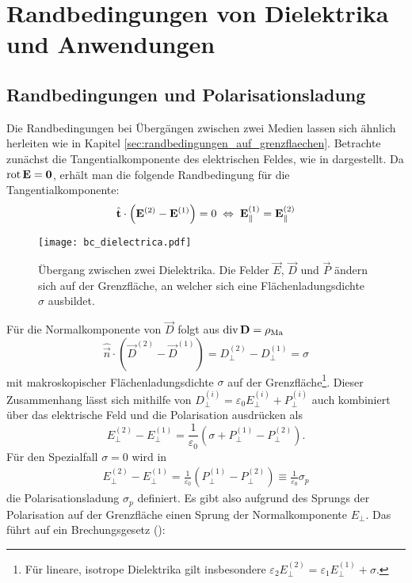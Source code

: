 \section{Randbedingungen von Dielektrika und Anwendungen\label{sec:randbedingungen_von_dielektrika}}

\subsection{Randbedingungen und Polarisationsladung}

Die Randbedingungen bei Übergängen zwischen zwei Medien lassen sich ähnlich herleiten wie in Kapitel \ref{sec:randbedingungen_auf_grenzflaechen}. Betrachte zunächst die Tangentialkomponente des elektrischen Feldes, wie in  dargestellt. Da $\operatorname{rot} \mathbf{E}=\mathbf{0}$, erhält man die folgende Randbedingung für die Tangentialkomponente:
\begin{equation*}
	\hat{\mathbf{t}}\cdot \left(\mathbf{E}^{\left(2\right)}-\mathbf{E}^{\left(1\right)}\right)=0\;\Leftrightarrow\; \mathbf{E}_{\parallel }^{\left(1\right)}=\mathbf{E}_{\parallel }^{\left(2\right)}
\end{equation*}


\begin{figure}[htb]
	\centering
	\texttt{[image: bc\_dielectrica.pdf]}
	\caption{Übergang zwischen zwei Dielektrika. Die Felder $\vec E$, $\vec D$ und $\vec P$ ändern sich auf der Grenzfläche, an welcher sich eine Flächenladungsdichte $\sigma$ ausbildet. }
	\label{fig:bc_dielectrica}
\end{figure}

Für die Normalkomponente von $\vec {D}$ folgt aus $\operatorname{div} \mathbf{D}=\rho _{\mathrm{Ma}}$
\begin{equation*}
	\hat{\vec {n}}\cdot \left(\vec {D}^{\left(2\right)}-\vec {D}^{\left(1\right)}\right)=D_{\perp }^{\left(2\right)}-D_{\perp }^{\left(1\right)}=\sigma
\end{equation*}
mit makroskopischer Flächenladungsdichte $\sigma $ auf der Grenzfläche\footnote{Für lineare, isotrope Dielektrika gilt insbesondere $\varepsilon _{2}E_{\perp }^{\left(2\right)}=\varepsilon _{1}E_{\perp }^{\left(1\right)}+\sigma .$}. Dieser Zusammenhang lässt sich mithilfe von $D_{\perp }^{\left(i\right)}=\varepsilon _{0}E_{\perp }^{\left(i\right)}+P_{\perp }^{\left(i\right)}$ auch kombiniert über das elektrische Feld und die Polarisation ausdrücken als
\begin{equation*}
	E_{\perp }^{\left(2\right)}-E_{\perp }^{\left(1\right)}=\frac{1}{\varepsilon _{0}}\left(\sigma +P_{\perp }^{\left(1\right)}-P_{\perp }^{\left(2\right)}\right).
\end{equation*}
Für den Spezialfall $\sigma =0$ wird in
\begin{align*}
	E_{\perp }^{\left(2\right)}-E_{\perp }^{\left(1\right)}=\frac{1}{\varepsilon _{0}}\left(P_{\perp }^{\left(1\right)}-P_{\perp }^{\left(2\right)}\right)\equiv \frac{1}{\varepsilon _{0}}\sigma _{p}
\end{align*}
die Polarisationsladung $\sigma _{p}$ definiert. Es gibt also aufgrund des Sprungs der Polarisation auf der Grenzfläche einen Sprung der Normalkomponente $E_{\perp }$. Das führt auf ein Brechungsgesetz ():

